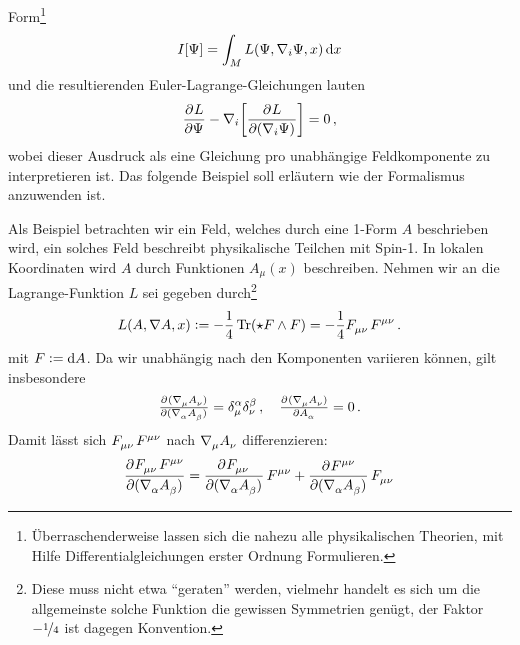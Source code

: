 Form\footnote{Überraschenderweise lassen sich die nahezu alle physikalischen
Theorien, mit Hilfe Differentialgleichungen erster Ordnung Formulieren.}
\begin{equation}
I[\Psi]=\int_M L\left(\Psi,\nabla_i \Psi,x\right)\dif x
\end{equation}
und die resultierenden Euler-Lagrange-Gleichungen lauten
\begin{equation}
\dpd{L}{\Psi}
-\nabla_i\left[\dpd{L}{(\nabla_i\Psi)}\right]=0\,,
\end{equation}
wobei dieser Ausdruck als eine Gleichung pro
unabhängige Feldkomponente zu interpretieren ist. Das folgende Beispiel soll
erläutern wie der Formalismus anzuwenden ist.
\begin{beispiel} \label{bsp:Spinone}
Als Beispiel betrachten wir ein Feld, welches durch eine
1-Form $A$ beschrieben wird, ein solches Feld beschreibt physikalische Teilchen
mit Spin-1.
In lokalen Koordinaten wird $A$ durch Funktionen $A_\mu(x)$ beschreiben.
Nehmen wir an die Lagrange-Funktion $L$ sei gegeben durch\footnote{Diese muss
nicht etwa "`geraten"' werden, vielmehr handelt es sich um die allgemeinste
solche Funktion die gewissen Symmetrien genügt, der Faktor $-\nicefrac{1}{4}$ ist dagegen
Konvention.}
\begin{equation}
L(A,\nabla A,x):=-\frac{1}{4}\tr\left(\star F\wedge
F\right)=-\frac{1}{4}\tensor{F}{_\mu_\nu}\tensor{F}{^\mu^\nu}\,.
\end{equation}
mit
$F:=\dif A$. Da wir unabhängig nach den Komponenten variieren können, gilt
insbesondere
\begin{equation}
\pd{(\tensor{\nabla}{_\mu}\tensor{A}{_\nu})}{(\tensor{\nabla}{_\alpha}\tensor{A}{_\beta})}
=\tensor*{\delta}{^\alpha_\mu}\tensor*{\delta}{^\beta_\nu}\,,\quad
\pd{(\tensor{\nabla}{_\mu}\tensor{A}{_\nu})}{\tensor{A}{_\alpha}}=0\,.
\end{equation}
Damit lässt sich $\tensor{F}{_\mu_\nu}\tensor{F}{^\mu^\nu}$ nach
$\tensor{\nabla}{_\mu}\tensor{A}{_\nu}$ differenzieren:
\begin{equation}
\begin{split}
\dpd{\tensor{F}{_\mu_\nu}\tensor{F}{^\mu^\nu}}{(\tensor{\nabla}{_\alpha}\tensor{A}{_\beta})}
&=\dpd{\tensor{F}{_\mu_\nu}}{(\tensor{\nabla}{_\alpha}\tensor{A}{_\beta})}\tensor{F}{^\mu^\nu}
 +\dpd{\tensor{F}{^\mu^\nu}}{(\tensor{\nabla}{_\alpha}\tensor{A}{_\beta})}\tensor{F}{_\mu_\nu}
 \\

\end{split}
\end{equation}
\end{beispiel}
